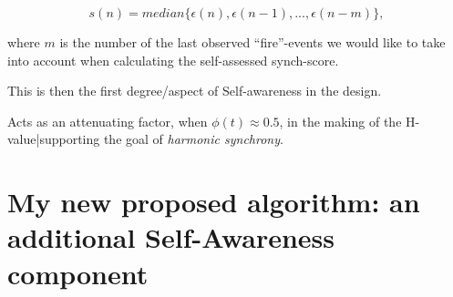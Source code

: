 			\begin{equation}
			\label{self_assessed_synch}
				s(n) = median\{\epsilon(n), \epsilon(n-1), ... , \epsilon(n-m)\} ,
			\end{equation} \nl
			
			where $m$ is the number of the last observed ``fire''-events we would like to take into account when calculating the self-assessed synch-score.
			
			This is then the first degree/aspect of Self-awareness in the design.
			
			
			Acts as an attenuating factor, when $\phi(t)\approx0.5$, in the making of the H-value|supporting the goal of \textit{harmonic synchrony}.

			


\section{My new proposed algorithm: an additional Self-Awareness component}
